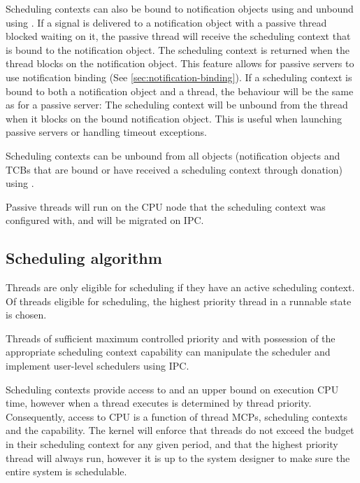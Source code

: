 Scheduling contexts can also be bound to notification objects using
 and unbound using
.  If a signal is delivered to
a notification object with a passive thread blocked waiting on it, the passive thread will receive
the scheduling context that is bound to the notification object.  The scheduling context is returned
when the thread blocks on the notification object.  This feature allows for passive servers to use
notification binding (See \autoref{sec:notification-binding}).  If a scheduling context is bound to
both a notification object and a thread, the behaviour will be the same as for a passive server:
The scheduling context will be unbound from the thread when it blocks on the bound notification object.
This is useful when launching passive servers or handling timeout exceptions.

Scheduling contexts can be unbound from all objects (notification objects and TCBs that are bound or
have received a scheduling context through donation) using
.

Passive threads will run on the CPU node that the scheduling context was configured with, and will
be migrated on IPC.

\subsection{Scheduling algorithm} \label{sec:mcs-sched}

Threads are only eligible for scheduling if they have an active scheduling context.
Of threads eligible for scheduling, the highest priority thread in a runnable state is chosen.

Threads of sufficient maximum controlled priority and with possession of the
appropriate scheduling context capability can manipulate the scheduler and
implement user-level schedulers using IPC.

Scheduling contexts provide access to and an upper bound on execution CPU time,
however when a thread executes is determined by thread priority.  Consequently,
access to CPU is a function of thread MCPs, scheduling contexts and the
 capability.  The kernel will enforce that threads do not
exceed the budget in their scheduling context for any given period, and that
the highest priority thread will always run, however it is up to the system
designer to make sure the entire system is schedulable.



